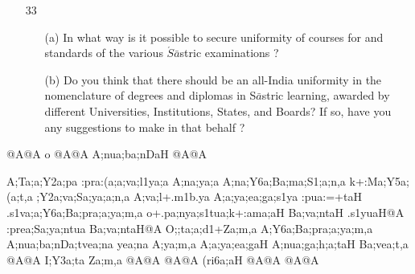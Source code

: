 {\begin{itemize}
\begin{itemize}
            \item[(c)] In what way can the public participate in financing Sanskrit Education ?
            
            \item[(d)] What measures, such as stipends, free-student\-ships, free boarding and lodging, etc., are necessary to attract students to the study of Sanskrit? 
            
            \item[(e)] Do you consider the facilities of stipends, fre-studentships, etc., now available in your part of the country suficient ?
            
           \end{itemize}         
           
 \item[33] \begin{itemize}
             
            \item[(a)] In what way is it possible to secure uniformity of courses for and standards of the various $\acute{S}\bar{a}$stric examinations ?
            
            \item[(b)] Do you think that there should be an all-India uniformity in the nomenclature of degrees and diplomas in S$\bar{a}$stric learning, awarded by different Universities, Institutions, States, and Boards? If so, have you any suggestions to make in that behalf ? 
           \end{itemize}           
                      
\end{itemize}
}


\thispagestyle{empty}
\begin{center}
{\sktf {}@A@A o @A@A A;nua;ba;nDaH
@A@A}
\end{center}

{\sktf A;Ta;a;Y2a;pa :pra:(a;a;va;l1ya;a A;na;ya;a
A;na;Y6a;Ba;ma;S1;a;n,a k+:Ma;Y5a;(a;t,a
;Y2a;va;Sa;ya;a;n,a A;va;l+.m1b.ya\ZF{,} A;a;ya;ea;ga;s1ya :pua:=+taH
.s1va;a;Y6a;Ba;pra;a;ya;m,a o+.pa;nya;s1tua;k+:ama;aH Ba;va;ntaH .s1yuaH@A :prea;Sa;ya;ntua
Ba;va;ntaH@A O;;ta;a;d1+Za;m,a A;Y6a;Ba;pra;a;ya;m,a
A;nua;ba;nDa;tvea;na\ZF{,} yea;na A;ya;m,a A;a;ya;ea;gaH
A;nua;ga;h;a;taH Ba;vea;t,a @A@A I;Y3a;ta Za;m,a @A@A\,\ZF{*}\,@A@A (ri6a;aH
@A@A\,\ZF{*}\,@A@A}


